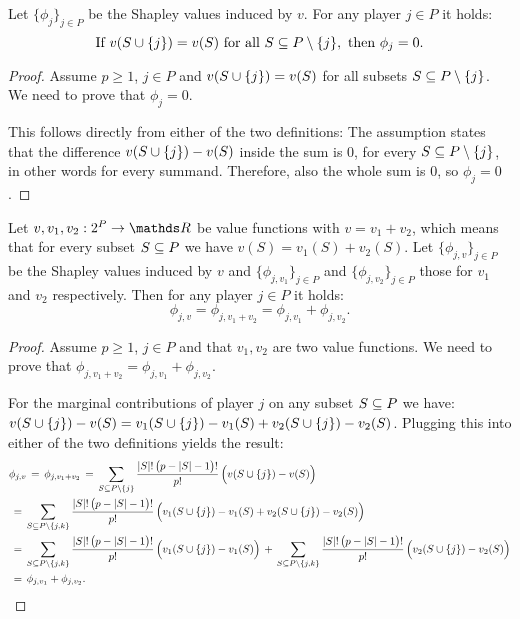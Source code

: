 {\begin{enumerate}
    \begin{theorem}
    Let $\{\phi_j\}_{j \in P}$ be the Shapley values induced by $v$.
    For any player $j \in P$  it holds:
    $$
    \text{If } v(S \cup \{j\}) = v(S) \text{ for all } S \subseteq P \setminus \{j\}, \text{ then } \phi_j = 0.
    $$
    \end{theorem}

    \begin{proof}

        Assume $p \geq 1$, $ j \in P$ and $v(S \cup \{j\}) = v(S)$ for all subsets $S \subseteq P \setminus \{j\}$. We need to prove that $\phi_j = 0$.
        
        This follows directly from either of the two definitions: The assumption states that the difference $v(S \cup \{j\}) - v(S)$ inside the sum is 0, for every $S \subseteq P \setminus \{j\}$, in other words for every summand.
        Therefore, also the whole sum is 0, so $\phi_j = 0$.
        
    \end{proof}

    \begin{theorem}[Additivity]
    Let $v, v_1, v_2 : 2^P \to \R$ be value functions with $v = v_1 + v_2$, which means that for every subset $S \subseteq P$ we have $v(S) = v_1(S) + v_2(S)$.
    Let $\{\phi_{j, v}\}_{j \in P}$ be the Shapley values induced by $v$ and $\{\phi_{j, v_1}\}_{j \in P}$ and $\{\phi_{j, v_2}\}_{j \in P}$ those for $v_1$ and $v_2$ respectively.
    Then for any player $j \in P$ it holds:
    $$
    \phi_{j, v} = \phi_{j, v_1+v_2} = \phi_{j, v_1} + \phi_{j, v_2}.
    $$
    \end{theorem}

    \begin{proof}

        Assume $p \geq 1$, $ j \in P$ and that $v_1, v_2$ are two value functions. We need to prove that $\phi_{j, v_1+v_2} = \phi_{j, v_1} + \phi_{j, v_2}$.
        
        For the marginal contributions of player $j$ on any subset $S \subseteq P$ we have: $v(S \cup \{j\}) - v(S) = v_1(S \cup \{j\}) - v_1(S) + v_2(S \cup \{j\}) - v_2(S)$.
        Plugging this into either of the two definitions yields the result:
        \begin{align*}
            &\phi_{j, v} \,=\, \phi_{j, v_1+v_2}
            \,=\, \sum_{S \subseteq P \setminus \{j\}} \frac{|S|!\,\bigl(p - |S| - 1\bigr)!}{p!} \, \Bigl( v(S \cup \{j\}) - v(S) \Bigr)  \\
            &\,=\, \sum_{S \subseteq P \setminus \{j, k\}} \frac{|S|!\,\bigl(p - |S| - 1\bigr)!}{p!} \, \Bigl( v_1(S \cup \{j\}) - v_1(S) + v_2(S \cup \{j\}) - v_2(S) \Bigr) \\
            &\,=\, \sum_{S \subseteq P \setminus \{j, k\}} \frac{|S|!\,\bigl(p - |S| - 1\bigr)!}{p!} \, \Bigl( v_1(S \cup \{j\}) - v_1(S) \Bigr) 
            \,+\, \sum_{S \subseteq P \setminus \{j, k\}} \frac{|S|!\,\bigl(p - |S| - 1\bigr)!}{p!} \, \Bigl( v_2(S \cup \{j\}) - v_2(S) \Bigr) \\
            &\,=\, \phi_{j, v_1} + \phi_{j, v_2}.
        \end{align*}
        

\end{proof}
\end{enumerate}}

